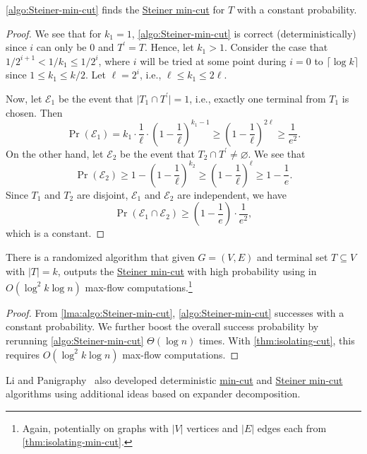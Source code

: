 \begin{lemma}\label{lma:algo:Steiner-min-cut}
	\autoref{algo:Steiner-min-cut} finds the \hyperref[prb:Steiner-min-cut]{Steiner min-cut} for \(T\) with a constant probability.
\end{lemma}
\begin{proof}
	We see that for \(k_1 = 1\), \autoref{algo:Steiner-min-cut} is correct (deterministically) since \(i\) can only be \(0\) and \(T^{\prime} = T\). Hence, let \(k_1 > 1\). Consider the case that \(1 / 2^{i+1} < 1 / k_1 \leq 1 / 2^i\), where \(i\) will be tried at some point during \(i=0\) to \(\lceil \log k \rceil \) since \(1 \leq k_1 \leq k / 2\). Let \(\ell = 2^i\), i.e., \(\ell \leq k_1 \leq 2 \ell \).

	Now, let \(\mathcal{E} _1\) be the event that \(\lvert T_1 \cap T^{\prime} \rvert = 1\), i.e., exactly one terminal from \(T_1\) is chosen. Then
	\[
		\Pr(\mathcal{E} _1)
		= k_1 \cdot \frac{1}{\ell } \cdot \left( 1 - \frac{1}{\ell } \right) ^{k_1 - 1}
		\geq \left( 1 - \frac{1}{\ell } \right) ^{2\ell }
		\geq \frac{1}{e^2}.
	\]
	On the other hand, let \(\mathcal{E} _2\) be the event that \(T_2 \cap T^{\prime} \neq \varnothing \). We see that
	\[
		\Pr(\mathcal{E} _2)
		\geq 1 - \left( 1 - \frac{1}{\ell } \right) ^{k_2}
		\geq \left( 1 - \frac{1}{\ell } \right) ^{\ell }
		\geq 1 - \frac{1}{e}.
	\]
	Since \(T_1\) and \(T_2\) are disjoint, \(\mathcal{E} _1\) and \(\mathcal{E} _2\) are independent, we have
	\[
		\Pr(\mathcal{E} _1 \cap \mathcal{E} _2)
		\geq \left( 1 - \frac{1}{e} \right) \cdot \frac{1}{e^2},
	\]
	which is a constant.
\end{proof}

\begin{theorem}
	There is a randomized algorithm that given \(G=(V, E)\) and terminal set \(T \subseteq V\) with \(\lvert T \rvert = k\), outputs the \hyperref[prb:Steiner-min-cut]{Steiner min-cut} with high probability using in \(O(\log^2 k \log n)\) max-flow computations.\footnote{Again, potentially on graphs with \(\lvert V \rvert \) vertices and \(\lvert E \rvert \) edges each from \autoref{thm:isolating-min-cut}.}
\end{theorem}
\begin{proof}
	From \autoref{lma:algo:Steiner-min-cut}, \autoref{algo:Steiner-min-cut} successes with a constant probability. We further boost the overall success probability by rerunning \autoref{algo:Steiner-min-cut} \(\Theta (\log n)\) times. With \autoref{thm:isolating-cut}, this requires \(O(\log ^2k \log n)\) max-flow computations.
\end{proof}

\begin{remark}
	Li and Panigraphy~\cite{li2020deterministic} also developed deterministic \hyperref[prb:global-min-cut]{min-cut} and \hyperref[prb:Steiner-min-cut]{Steiner min-cut} algorithms using additional ideas based on expander decomposition.
\end{remark}